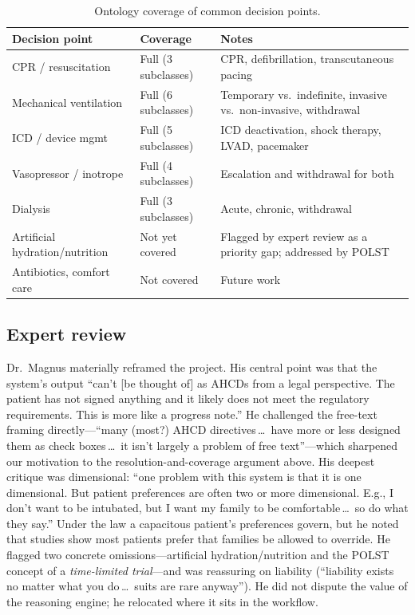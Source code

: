 \documentclass[10pt]{article}
\begin{document}
\begin{table}[ht]
\centering
\caption{Ontology coverage of common decision points.}
\label{tab:coverage}
\small
\begin{tabularx}{0.95\textwidth}{L{3.4cm} L{2.6cm} X}
\toprule
\textbf{Decision point} & \textbf{Coverage} & \textbf{Notes} \\
\midrule
CPR / resuscitation & Full (3 subclasses) & CPR, defibrillation, transcutaneous pacing \\
Mechanical ventilation & Full (6 subclasses) & Temporary vs.\ indefinite, invasive vs.\ non-invasive, withdrawal \\
ICD / device mgmt & Full (5 subclasses) & ICD deactivation, shock therapy, LVAD, pacemaker \\
Vasopressor / inotrope & Full (4 subclasses) & Escalation and withdrawal for both \\
Dialysis & Full (3 subclasses) & Acute, chronic, withdrawal \\
\midrule
Artificial hydration/nutrition & Not yet covered & Flagged by expert review as a priority gap; addressed by POLST \\
Antibiotics, comfort care & Not covered & Future work \\
\bottomrule
\end{tabularx}
\end{table}

\subsection{Expert review}
Dr.\ Magnus materially reframed the project. His central point was that the system's output ``can't [be thought of] as AHCDs from a legal perspective. The patient has not signed anything and it likely does not meet the regulatory requirements. This is more like a progress note.'' He challenged the free-text framing directly---``many (most?) AHCD directives\,\dots\ have more or less designed them as check boxes\,\dots\ it isn't largely a problem of free text''---which sharpened our motivation to the resolution-and-coverage argument above. His deepest critique was dimensional: ``one problem with this system is that it is one dimensional. But patient preferences are often two or more dimensional. E.g., I don't want to be intubated, but I want my family to be comfortable\,\dots\ so do what they say.'' Under the law a capacitous patient's preferences govern, but he noted that studies show most patients prefer that families be allowed to override. He flagged two concrete omissions---artificial hydration/nutrition and the POLST concept of a \emph{time-limited trial}---and was reassuring on liability (``liability exists no matter what you do\,\dots\ suits are rare anyway''). He did not dispute the value of the reasoning engine; he relocated where it sits in the workflow.
\end{document}
